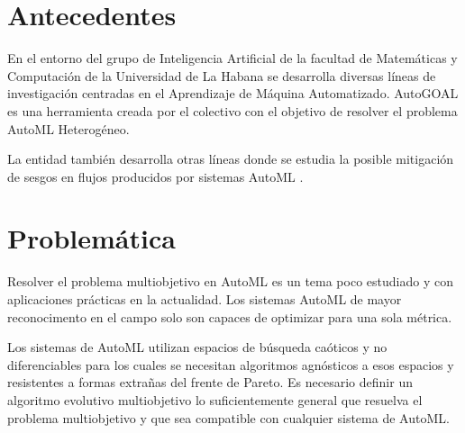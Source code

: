 \section*{Antecedentes}

En el entorno del grupo de Inteligencia Artificial de la facultad de Matem\'aticas y Computaci\'on de la Universidad de La Habana se desarrolla diversas l\'ineas de investigaci\'on centradas en el Aprendizaje de M\'aquina Automatizado. AutoGOAL  es una herramienta creada por el colectivo con el objetivo de resolver el problema AutoML Heterog\'eneo.

La entidad tambi\'en desarrolla otras l\'ineas donde se estudia la posible mitigaci\'on de sesgos en flujos producidos por sistemas AutoML . 


\section*{Problem\'atica}
Resolver el problema multiobjetivo en AutoML es un tema poco estudiado y con aplicaciones pr\'acticas en la actualidad.
Los sistemas AutoML de mayor reconocimento en el campo solo son capaces de optimizar para una sola m\'etrica. 

Los sistemas de AutoML utilizan espacios de b\'usqueda ca\'oticos y no diferenciables para los cuales se necesitan algoritmos agn\'osticos a esos espacios y resistentes a formas extra\~nas del frente de Pareto. Es necesario definir un algoritmo evolutivo multiobjetivo lo suficientemente general que resuelva el problema multiobjetivo y que sea compatible con cualquier sistema de AutoML.

